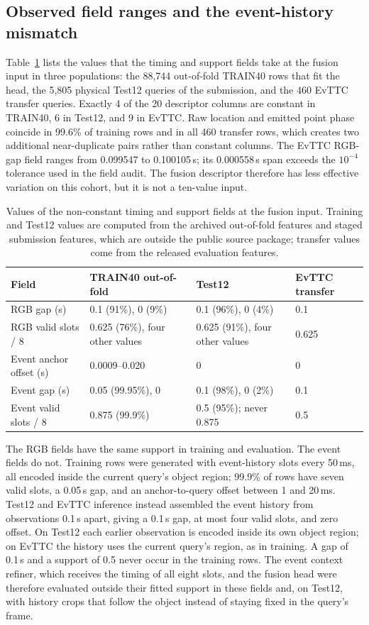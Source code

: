 \subsection{Observed field ranges and the event-history mismatch}
\label{sec:field-ranges}
Table~\ref{tab:field-ranges} lists the values that the timing and support fields take at the fusion input in three populations: the 88,744 out-of-fold TRAIN40 rows that fit the head, the 5,805 physical Test12 queries of the submission, and the 460 EvTTC transfer queries. Exactly 4 of the 20 descriptor columns are constant in TRAIN40, 6 in Test12, and 9 in EvTTC. Raw location and emitted point phase coincide in 99.6\% of training rows and in all 460 transfer rows, which creates two additional near-duplicate pairs rather than constant columns. The EvTTC RGB-gap field ranges from 0.099547 to 0.100105\,s; its 0.000558\,s span exceeds the $10^{-4}$ tolerance used in the field audit. The fusion descriptor therefore has less effective variation on this cohort, but it is not a ten-value input.

\begin{table}[htbp]
\centering\small
\begin{tabular}{llll}
\toprule
Field & TRAIN40 out-of-fold & Test12 & EvTTC transfer \\
\midrule
RGB gap (s) & 0.1 (91\%), 0 (9\%) & 0.1 (96\%), 0 (4\%) & 0.1 \\
RGB valid slots / 8 & 0.625 (76\%), four other values & 0.625 (91\%), four other values & 0.625 \\
Event anchor offset (s) & 0.0009--0.020 & 0 & 0 \\
Event gap (s) & 0.05 (99.95\%), 0 & 0.1 (98\%), 0 (2\%) & 0.1 \\
Event valid slots / 8 & 0.875 (99.9\%) & 0.5 (95\%); never 0.875 & 0.5 \\
\bottomrule
\end{tabular}
\caption{Values of the non-constant timing and support fields at the fusion input. Training and Test12 values are computed from the archived out-of-fold features and staged submission features, which are outside the public source package; transfer values come from the released evaluation features.}
\label{tab:field-ranges}
\end{table}

The RGB fields have the same support in training and evaluation. The event fields do not. Training rows were generated with event-history slots every 50\,ms, all encoded inside the current query's object region; 99.9\% of rows have seven valid slots, a 0.05\,s gap, and an anchor-to-query offset between 1 and 20\,ms. Test12 and EvTTC inference instead assembled the event history from observations 0.1\,s apart, giving a 0.1\,s gap, at most four valid slots, and zero offset. On Test12 each earlier observation is encoded inside its own object region; on EvTTC the history uses the current query's region, as in training. A gap of 0.1\,s and a support of 0.5 never occur in the training rows. The event context refiner, which receives the timing of all eight slots, and the fusion head were therefore evaluated outside their fitted support in these fields and, on Test12, with history crops that follow the object instead of staying fixed in the query's frame.

